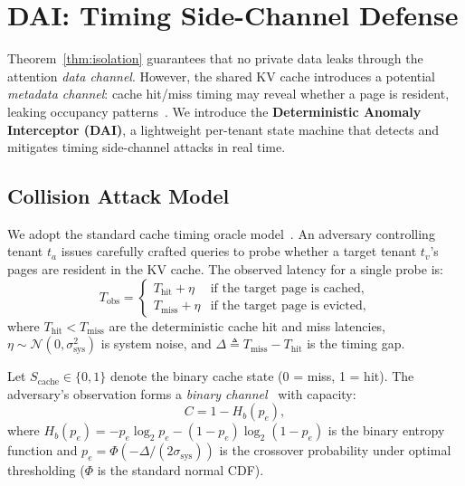 
\section{DAI: Timing Side-Channel Defense}
\label{sec:dai}

Theorem~\ref{thm:isolation} guarantees that no private data leaks through the attention
\emph{data channel}. However, the shared KV cache introduces a potential \emph{metadata
channel}: cache hit/miss timing may reveal whether a page is resident, leaking occupancy
patterns~\cite{osvik2006cache, yarom2014flush, percival2005cache}. We introduce the
\textbf{Deterministic Anomaly Interceptor (DAI)}, a lightweight per-tenant state machine
that detects and mitigates timing side-channel attacks in real time.

\subsection{Collision Attack Model}
\label{sec:dai:attack}

We adopt the standard cache timing oracle model~\cite{osvik2006cache, percival2005cache}.
An adversary controlling tenant $t_a$ issues carefully crafted queries to probe whether
a target tenant $t_v$'s pages are resident in the KV cache. The observed latency for a
single probe is:
\begin{equation}
    T_{\mathrm{obs}} = \begin{cases}
        T_{\mathrm{hit}} + \eta & \text{if the target page is cached}, \\
        T_{\mathrm{miss}} + \eta & \text{if the target page is evicted},
    \end{cases}
    \label{eq:timing-oracle}
\end{equation}
where $T_{\mathrm{hit}} < T_{\mathrm{miss}}$ are the deterministic cache hit and miss
latencies, $\eta \sim \mathcal{N}(0, \sigma_{\mathrm{sys}}^2)$ is system noise, and
$\Delta \triangleq T_{\mathrm{miss}} - T_{\mathrm{hit}}$ is the timing gap.

Let $S_{\mathrm{cache}} \in \{0, 1\}$ denote the binary cache state (0 = miss, 1 = hit).
The adversary's observation forms a \emph{binary channel}~\cite{shannon1948mathematical}
with capacity:
\begin{equation}
    C = 1 - H_b(p_e),
    \label{eq:channel-capacity}
\end{equation}
where $H_b(p_e) = -p_e \log_2 p_e - (1 - p_e)\log_2(1 - p_e)$ is the binary entropy
function and $p_e = \Phi(-\Delta / (2\sigma_{\mathrm{sys}}))$ is the crossover probability
under optimal thresholding ($\Phi$ is the standard normal CDF).

